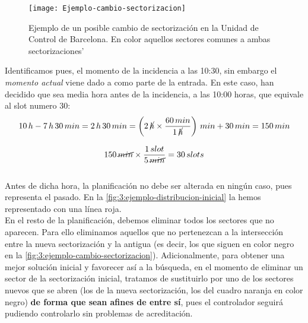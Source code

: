 \begin{figure}[htbp]
	\centering
	\texttt{[image: Ejemplo-cambio-sectorizacion]}
	\caption[Ejemplo de cambio de sectorización]{Ejemplo de un posible cambio de sectorización en la Unidad de Control 
	de Barcelona. En color aquellos sectores comunes a ambas sectorizaciones'}
	\label{fig:3:ejemplo-cambio-sectorizacion}
\end{figure}


Identificamos pues, el momento de la incidencia a las 10:30, sin embargo el \textit{momento actual} viene dado a como parte de la entrada. En este caso, han decidido que sea media hora antes de la incidencia, a las 10:00 horas, que equivale al slot numero 30:
\[ 
	10 \,h-7 \,h \,30 \,min = 2 \,h \,30 \,min = \left(2 \, \cancel{h} \times \frac{60 \,min}{1 \,\cancel{h}}\right) 
	\,min + 30\,min = 150 
	\,min 
\]

\[
	150 \,\cancel{min} \times \frac{1\,slot}{5\,\cancel{min}} = 30\,slots
\]
\\

Antes de dicha hora, la planificación no debe ser alterada en ningún caso, pues representa el pasado. En la 
\autoref{fig:3:ejemplo-distribucion-inicial} la hemos representado con una línea roja. 
\\

En el resto de la planificación, debemos eliminar todos los sectores que no aparecen. Para ello eliminamos aquellos que no pertenezcan a la intersección entre la nueva sectorización y la antigua (es decir, los que siguen en color negro en la \autoref{fig:3:ejemplo-cambio-sectorizacion}). 
Adicionalmente, para obtener una mejor solución inicial y favorecer así a la búsqueda, en el momento de eliminar un sector de la sectorización inicial, tratamos de sustituirlo por uno de los sectores nuevos que se abren (los de la nueva sectorización, los del cuadro naranja en color negro) \textbf{de forma que sean afines de entre sí}, pues el controlador seguirá pudiendo controlarlo sin problemas de acreditación. %
\\

